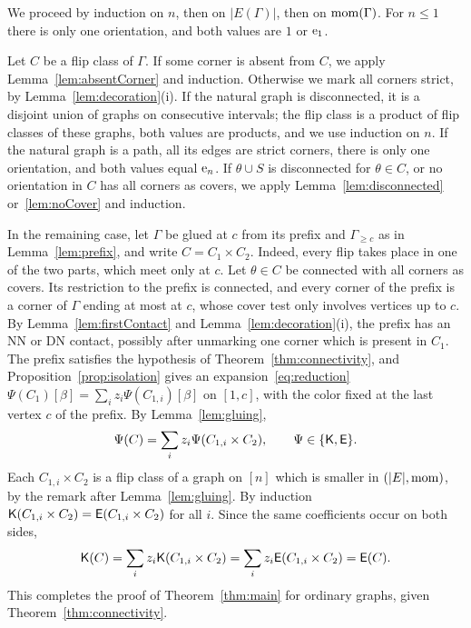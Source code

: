 We proceed by induction on $n$, then on $|E(\Gamma)|$, then on $\operatorname{mom}(\Gamma)$.
For $n\leq1$ there is only one orientation, and both values are $1$ or
$\mathrm{e}_1$.

Let $C$ be a flip class of $\Gamma$.
If some corner is absent from $C$, we apply Lemma~\ref{lem:absentCorner} and
induction.
Otherwise we mark all corners strict, by Lemma~\ref{lem:decoration}(i).
If the natural graph is disconnected, it is a disjoint union of graphs on
consecutive intervals; the flip class is a product of flip classes of these
graphs, both values are products, and we use induction on $n$.
If the natural graph is a path, all its edges are strict corners, there is
only one orientation, and both values equal $\mathrm{e}_n$.
If $\theta\cup S$ is disconnected for $\theta\in C$, or no orientation in $C$
has all corners as covers, we apply Lemma~\ref{lem:disconnected}
or~\ref{lem:noCover} and induction.

In the remaining case, let $\Gamma$ be glued at $c$ from its prefix and
$\Gamma_{\geq c}$ as in Lemma~\ref{lem:prefix}, and write $C=C_1\times C_2$.
Indeed, every flip takes place in one of the two parts, which meet only at $c$.
Let $\theta\in C$ be connected with all corners as covers.
Its restriction to the prefix is connected, and every corner of the prefix is a
corner of $\Gamma$ ending at most at $c$, whose cover test only involves
vertices up to $c$.
By Lemma~\ref{lem:firstContact} and Lemma~\ref{lem:decoration}(i), the prefix
has an NN or DN contact, possibly after unmarking one corner which is present in
$C_1$.
The prefix satisfies the hypothesis of Theorem~\ref{thm:connectivity}, and
Proposition~\ref{prop:isolation} gives an expansion~\eqref{eq:reduction}
$\Psi(C_1)[\beta]=\sum_iz_i\Psi(C_{1,i})[\beta]$ on $[1,c]$, with the color fixed at
the last vertex $c$ of the prefix.
By Lemma~\ref{lem:gluing},
\[
 \Psi(C)=\sum_iz_i\Psi(C_{1,i}\times C_2),\qquad \Psi\in\{\mathsf{K},\mathsf{E}\}.
\]
Each $C_{1,i}\times C_2$ is a flip class of a graph on $[n]$ which is smaller in
$(|E|,\operatorname{mom})$, by the remark after Lemma~\ref{lem:gluing}.
By induction $\mathsf{K}(C_{1,i}\times C_2)=\mathsf{E}(C_{1,i}\times C_2)$ for all $i$.
Since the same coefficients occur on both sides,
\[
 \mathsf{K}(C)=\sum_i z_i\mathsf{K}(C_{1,i}\times C_2)
 =\sum_i z_i\mathsf{E}(C_{1,i}\times C_2)=\mathsf{E}(C).
\]
This completes the proof of Theorem~\ref{thm:main} for ordinary graphs, given
Theorem~\ref{thm:connectivity}.
